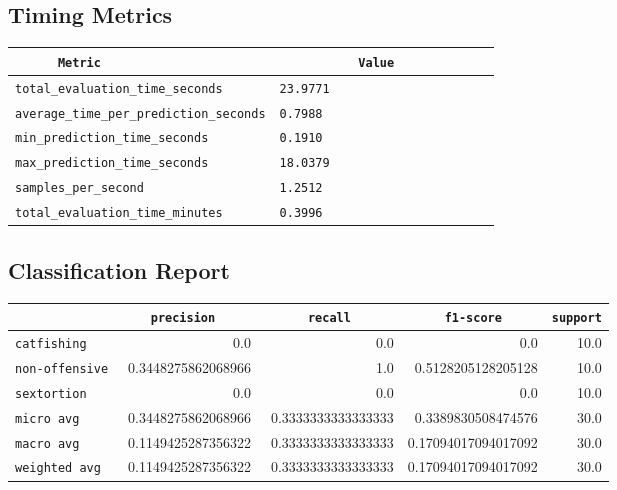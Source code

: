 \documentclass{article}
\begin{document}
\subsection{Timing Metrics}

\begin{center}
\begin{tabular}{l | l} \hline
    \verb|      Metric     | & \verb|           Value           | \\ \hline
    \hline
    \verb|total_evaluation_time_seconds| & \verb|23.9771                      | \\ \hline
    \verb|average_time_per_prediction_seconds| & \verb|0.7988                       | \\ \hline
    \verb|min_prediction_time_seconds| & \verb|0.1910                       | \\ \hline
    \verb|max_prediction_time_seconds| & \verb|18.0379                      | \\ \hline
    \verb|samples_per_second| & \verb|1.2512                       | \\ \hline
    \verb|total_evaluation_time_minutes| & \verb|0.3996                       | \\ \hline
\end{tabular}
\end{center}

\subsection{Classification Report}

\begin{center}
\begin{tabular}{l | r | r | r | r} \hline
    \verb|            | & \verb|    precision     | & \verb|      recall      | & \verb|     f1-score     | & \verb|support| \\ \hline
    \hline
    \verb|catfishing | & 0.0 & 0.0 & 0.0 &    10.0 \\ \hline
    \verb|non-offensive| & 0.3448275862068966 & 1.0 & 0.5128205128205128 &    10.0 \\ \hline
    \verb|sextortion | & 0.0 & 0.0 & 0.0 &    10.0 \\ \hline
    \verb|micro avg  | & 0.3448275862068966 & 0.3333333333333333 & 0.3389830508474576 &    30.0 \\ \hline
    \verb|macro avg  | & 0.1149425287356322 & 0.3333333333333333 & 0.17094017094017092 &    30.0 \\ \hline
    \verb|weighted avg| & 0.1149425287356322 & 0.3333333333333333 & 0.17094017094017092 &    30.0 \\ \hline
\end{tabular}
\end{center}
\end{document}
